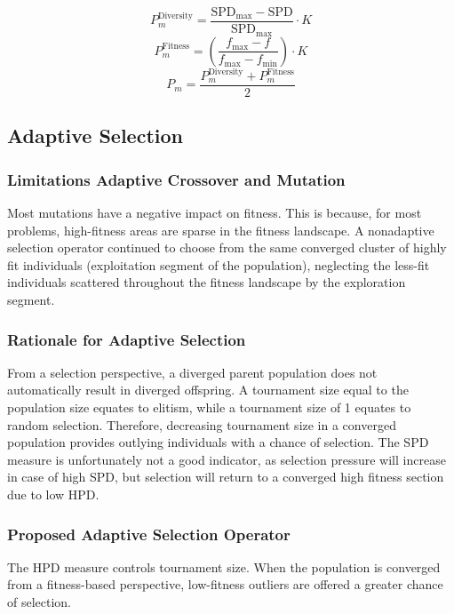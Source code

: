 \documentclass[../main.tex]{subfiles}
\begin{document}
\begin{equation}
P_m^{\text{Diversity}} = \frac{\text{SPD}_\text{max} - \text{SPD}}{\text{SPD}_\text{max}} \cdot K
\end{equation}
\begin{equation}
P_m^{\text{Fitness}} = \left( \frac{f_{\text{max}} - f}{f_{\text{max}} - f_{\text{min}}} \right) \cdot K
\end{equation}
\begin{equation}
	P_m = \frac{P_m^{\text{Diversity}}  + P_m^{\text{Fitness}}}{2}
\end{equation}

\subsection{Adaptive Selection}

\subsubsection{Limitations Adaptive Crossover and Mutation} Most mutations have a negative impact on fitness. This is
because, for most problems, high-fitness areas are sparse in the fitness landscape. A nonadaptive selection operator
continued to choose from the same converged cluster of highly fit individuals (exploitation segment of the population),
neglecting the less-fit individuals scattered throughout the fitness landscape by the exploration segment.

\subsubsection{Rationale for Adaptive Selection} From a selection perspective, a diverged parent population does not
automatically result in diverged offspring.  A tournament size equal to the population size equates to elitism, while a
tournament size of 1 equates to random selection. Therefore, decreasing tournament size in a converged population
provides outlying individuals with a chance of selection. The SPD measure is unfortunately not a good indicator, as
selection pressure will increase in case of high SPD, but selection will return to a converged high fitness section due
to low HPD.

\subsubsection{Proposed Adaptive Selection Operator} The HPD measure controls tournament size. When the population is
converged from a fitness-based perspective, low-fitness outliers are offered a greater chance of selection.
\end{document}
